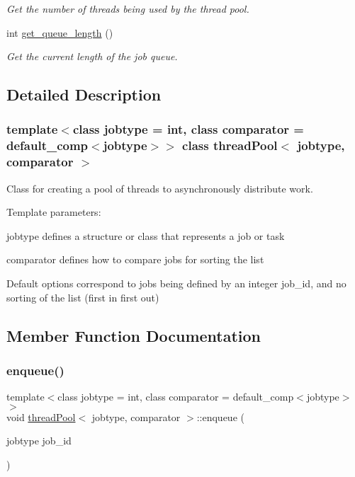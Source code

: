 \begin{DoxyCompactItemize}
\begin{DoxyCompactList}\small\item\em Get the number of threads being used by the thread pool. \end{DoxyCompactList}\item 
\mbox{\label{classthreadPool_a12646e379d9eef439e3a779eda483a4a}} 
int \hyperlink{classthreadPool_a12646e379d9eef439e3a779eda483a4a}{get\+\_\+queue\+\_\+length} ()
\begin{DoxyCompactList}\small\item\em Get the current length of the job queue. \end{DoxyCompactList}\end{DoxyCompactItemize}


\subsection{Detailed Description}
\subsubsection*{template$<$class jobtype = int, class comparator = default\+\_\+comp$<$jobtype$>$$>$\newline
class thread\+Pool$<$ jobtype, comparator $>$}

Class for creating a pool of threads to asynchronously distribute work. 

Template parameters\+:

jobtype defines a structure or class that represents a job or task

comparator defines how to compare jobs for sorting the list

Default options correspond to jobs being defined by an integer job\+\_\+id, and no sorting of the list (first in first out) 

\subsection{Member Function Documentation}
\mbox{\label{classthreadPool_a8032717dcc11834427f874bc1efd6376}} 
\subsubsection{\texorpdfstring{enqueue()}{enqueue()}}
{\footnotesize\ttfamily template$<$class jobtype  = int, class comparator  = default\+\_\+comp$<$jobtype$>$$>$ \\
void \hyperlink{classthreadPool}{thread\+Pool}$<$ jobtype, comparator $>$\+::enqueue (\begin{DoxyParamCaption}\item[{jobtype}]{job\+\_\+id }\end{DoxyParamCaption})\hspace{0.3cm}{\ttfamily [inline]}}




